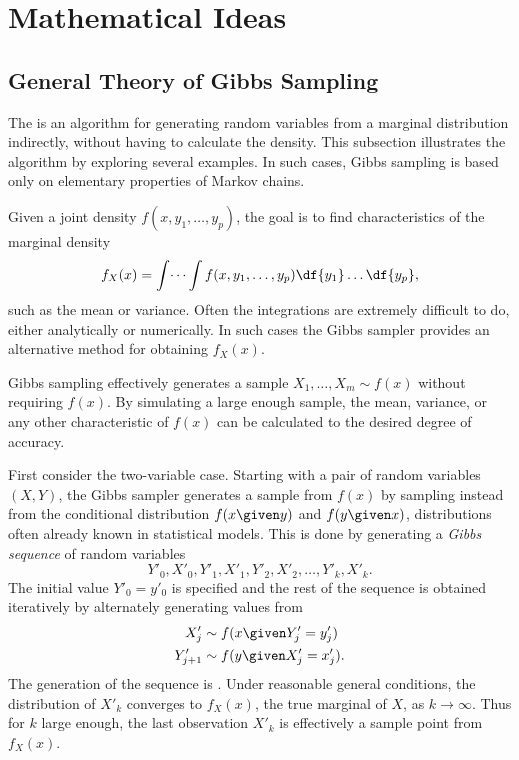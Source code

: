 \documentclass[12pt]{article}
\begin{document}
\hr

\section*{Mathematical Ideas}
\subsection*{General Theory of Gibbs Sampling}

The %
is an algorithm for generating random variables from a marginal
distribution indirectly, without having to calculate the density.  This
subsection illustrates the algorithm by exploring several examples.  In
such cases, Gibbs sampling is based only on elementary properties of
Markov chains.

Given a joint density \( f(x, y_1, \dots, y_p) \),%
the goal is to find characteristics of the marginal density%
\[
    f_{X}(x) = \int \dots \int f(x, y_1, \dots, y_p) \df{y_1} \dots \df{y_p},
\] such as the mean or variance.  Often the integrations are extremely
difficult to do, either analytically or numerically.  In such cases the
Gibbs sampler provides an alternative method for obtaining \( f_X(x) \).

Gibbs sampling%
effectively generates a sample \( X_1, \dots, X_m \sim f(x) \) without
requiring \( f(x) \).  By simulating a large enough sample, the mean,
variance, or any other characteristic of \( f(x) \) can be calculated to
the desired degree of accuracy.

First consider the two-variable case.  Starting with a pair of random
variables \( (X, Y) \), the Gibbs sampler generates a sample from \( f(x)
\) by sampling instead from the conditional distribution \( f(x \given y)
\) and \( f(y \given x) \), distributions often already known in
statistical models.  This is done by generating a \emph{Gibbs sequence}%
of random variables
\begin{equation}
    Y'_0, X'_0, Y'_1, X'_1, Y'_2, X'_2, \dots, Y'_k, X'_k.%
    \label{gibbssampler:eq:gibbsseq}
\end{equation}
The initial value \( Y'_0 = y'_0 \) is specified and the rest of the
sequence is obtained iteratively by alternately generating values from
\begin{align*}
    X'_j &\sim f(x \given Y'_j = y'_j) \\
    Y'_{j+1} &\sim f(y \given X'_j = x'_j).  \\
\end{align*}
The generation of the sequence is .%
Under reasonable general conditions, the distribution of \( X'_k \)
converges to \( f_X(x) \), the true marginal of \( X \), as \( k \to
\infty \).  Thus for \( k \) large enough, the last observation \( X'_k \)
is effectively a sample point from \( f_X(x) \).
\end{document}
